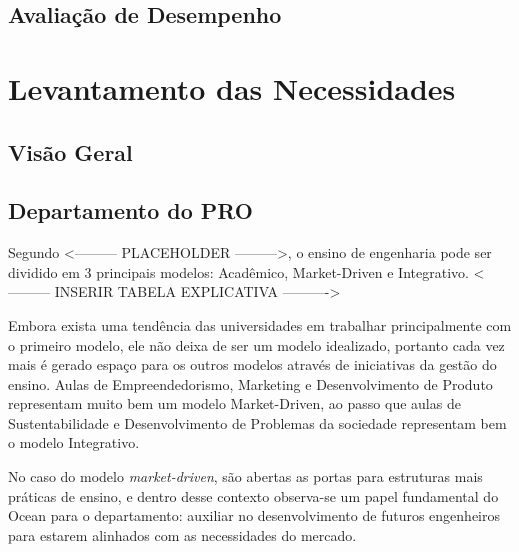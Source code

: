 \section{Avaliação de Desempenho}
\label{cha:avalia_o_de_desempenho}

\chapter{Levantamento das Necessidades}
\label{cha:trabalhos_futuros}

\section{Visão Geral}
\label{sec:visao_geral}

\section{Departamento do PRO}
\label{sec:dep_pro}

Segundo <--------- PLACEHOLDER --------->, o ensino de engenharia pode ser dividido em 3 principais modelos: Acadêmico, Market-Driven e Integrativo. <--------- INSERIR TABELA EXPLICATIVA ---------->

Embora exista uma tendência das universidades em trabalhar principalmente com o primeiro modelo, ele não deixa de ser um modelo idealizado, portanto cada vez mais é gerado espaço para os outros modelos através de iniciativas da gestão do ensino. Aulas de Empreendedorismo, Marketing e Desenvolvimento de Produto representam muito bem um modelo Market-Driven, ao passo que aulas de Sustentabilidade e Desenvolvimento de Problemas da sociedade representam bem o modelo Integrativo.

No caso do modelo \textit{market-driven}, são abertas as portas para estruturas mais práticas de ensino, e dentro desse contexto observa-se um papel fundamental do Ocean para o departamento: auxiliar no desenvolvimento de futuros engenheiros para estarem alinhados com as necessidades do mercado. 